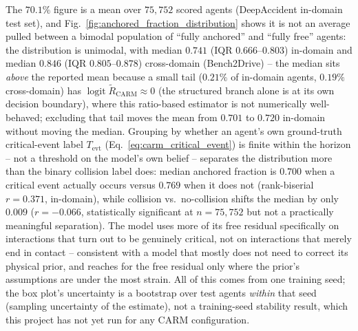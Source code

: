 \documentclass[letterpaper, 10 pt, conference]{ieeeconf}  %
\begin{document}
The $70.1\%$ figure is a mean over $75{,}752$ scored agents (DeepAccident
in-domain test set), and Fig.~\ref{fig:anchored_fraction_distribution}
shows it is not an average pulled between a bimodal population of ``fully
anchored'' and ``fully free'' agents: the distribution
is unimodal, with median $0.741$ (IQR $0.666$--$0.803$) in-domain and
median $0.846$ (IQR $0.805$--$0.878$) cross-domain (Bench2Drive) -- the
median sits \emph{above} the reported mean because a small tail
($0.21\%$ of in-domain agents, $0.19\%$ cross-domain) has
$\operatorname{logit}\widetilde R_{\mathrm{CARM}}\approx 0$ (the structured
branch alone is at its own decision boundary), where this ratio-based
estimator is not numerically well-behaved; excluding that tail moves the
mean from $0.701$ to $0.720$ in-domain without moving the median. Grouping
by whether an agent's own ground-truth critical-event label $T_{\mathrm
{evt}}$ (Eq.~\eqref{eq:carm_critical_event}) is finite within the horizon
-- not a threshold on the model's own belief -- separates the distribution
more than the binary collision label does: median anchored fraction is
$0.700$ when a critical event actually occurs versus $0.769$ when it does
not (rank-biserial $r=0.371$, in-domain), while collision vs.\ no-collision
shifts the median by only $0.009$ ($r=-0.066$, statistically significant at
$n=75{,}752$ but not a practically meaningful separation). The model uses
more of its free residual specifically on interactions that turn out to be
genuinely critical, not on interactions that merely end in contact --
consistent with a model that mostly does not need to correct its physical
prior, and reaches for the free residual only where the prior's
assumptions are under the most strain. All of this comes from one
training seed; the box plot's uncertainty is a bootstrap over test
agents \emph{within} that seed (sampling uncertainty of the estimate), not
a training-seed stability result, which this project has not yet run for
any CARM configuration.
\end{document}
